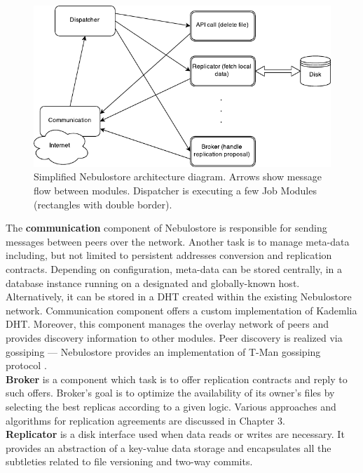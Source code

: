 \documentclass{pracamgren}
\begin{document}
\begin{figure}[h]
\centering
\includegraphics[scale=1.25]{arch.pdf}
\caption{Simplified Nebulostore architecture diagram. Arrows show message flow between modules. Dispatcher is executing a few Job Modules (rectangles with double border).}
\end{figure}

The {\bf communication} component of Nebulostore is responsible for sending messages between peers over the network. Another task is to manage meta-data including, but not limited to persistent addresses conversion and replication contracts. Depending on configuration, meta-data can be stored centrally, in a database instance running on a designated and globally-known host. Alternatively, it can be stored in a DHT created within the existing Nebulostore network. Communication component offers a custom implementation of Kademlia \cite{kademlia} DHT. Moreover, this component manages the overlay network of peers and provides discovery information to other modules. Peer discovery is realized via gossiping \cite{gossiping} --- Nebulostore provides an implementation of T-Man gossiping protocol \cite{tman}.\\

{\bf Broker} is a component which task is to offer replication contracts and reply to such offers. Broker's goal is to optimize the availability of its owner's files by selecting the best replicas according to a given logic. Various approaches and algorithms for replication agreements are discussed in Chapter 3.\\

{\bf Replicator} is a disk interface used when data reads or writes are necessary. It provides an abstraction of a key-value data storage and encapsulates all the subtleties related to file versioning and two-way commits.\\
\end{document}
